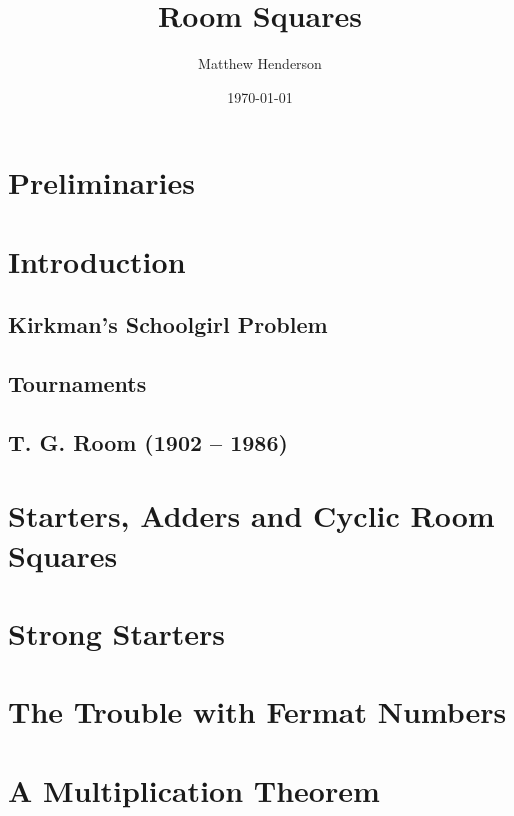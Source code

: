 \documentclass[a4paper, draft]{book}
\title{Room Squares}
\author{Matthew Henderson}
\date{\today}
\begin{document}
\frontmatter
\maketitle
\tableofcontents

\mainmatter

\chapter{Preliminaries}
  \label{ch:preliminaries}
  
  
  

\chapter{Introduction}
  \label{ch:introduction}
  \section{Kirkman’s Schoolgirl Problem}
    
  \section{Tournaments}
    
  \section{T. G. Room (1902 -- 1986)}
    

\chapter{Starters, Adders and Cyclic Room Squares}
  \label{ch:starter-adder}
  

\chapter{Strong Starters}
  \label{ch:strong-starters}
  
  

\chapter{The Trouble with Fermat Numbers}
  \label{ch:trouble-fermat}
  

\chapter{A Multiplication Theorem}
  \label{ch:multiplication-theorem}
  
  
\end{document}
